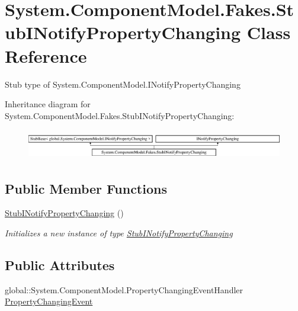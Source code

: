\hypertarget{class_system_1_1_component_model_1_1_fakes_1_1_stub_i_notify_property_changing}{\section{System.\-Component\-Model.\-Fakes.\-Stub\-I\-Notify\-Property\-Changing Class Reference}
\label{class_system_1_1_component_model_1_1_fakes_1_1_stub_i_notify_property_changing}
}


Stub type of System.\-Component\-Model.\-I\-Notify\-Property\-Changing 


Inheritance diagram for System.\-Component\-Model.\-Fakes.\-Stub\-I\-Notify\-Property\-Changing\-:\begin{figure}[H]
\begin{center}
\leavevmode
\includegraphics[height=1.333333cm]{class_system_1_1_component_model_1_1_fakes_1_1_stub_i_notify_property_changing}
\end{center}
\end{figure}
\subsection*{Public Member Functions}
\begin{DoxyCompactItemize}
\item 
\hyperlink{class_system_1_1_component_model_1_1_fakes_1_1_stub_i_notify_property_changing_a16561ff704cf9238a137248cb06ed09b}{Stub\-I\-Notify\-Property\-Changing} ()
\begin{DoxyCompactList}\small\item\em Initializes a new instance of type \hyperlink{class_system_1_1_component_model_1_1_fakes_1_1_stub_i_notify_property_changing}{Stub\-I\-Notify\-Property\-Changing}\end{DoxyCompactList}\end{DoxyCompactItemize}
\subsection*{Public Attributes}
\begin{DoxyCompactItemize}
\item 
global\-::\-System.\-Component\-Model.\-Property\-Changing\-Event\-Handler \hyperlink{class_system_1_1_component_model_1_1_fakes_1_1_stub_i_notify_property_changing_a9323fbcbe8d2ec6a25dfe975b4800241}{Property\-Changing\-Event}
\end{DoxyCompactItemize}


